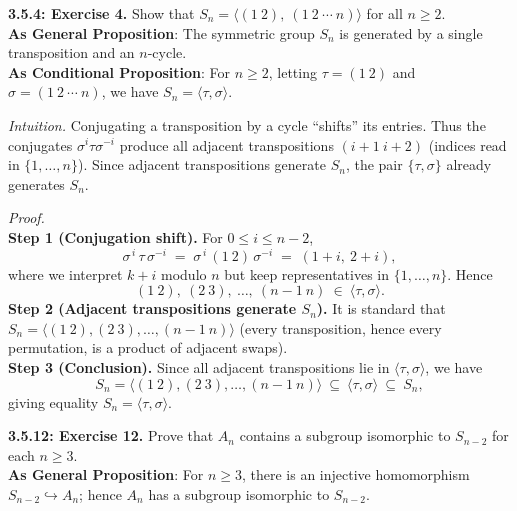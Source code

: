 \documentclass[12pt]{article}
\theoremstyle{definition}
\begin{document}
\newpage

\noindent \textbf{3.5.4: Exercise 4.} Show that $S_n=\langle (1\ 2),\ (1\ 2\ \cdots\ n)\rangle$ for all $n\ge 2$.\\ %

\noindent\textbf{As General Proposition}: The symmetric group $S_n$ is generated by a single transposition and an $n$-cycle.\\

\noindent \textbf{As Conditional Proposition}: For $n\ge 2$, letting $\tau=(1\ 2)$ and $\sigma=(1\ 2\ \cdots\ n)$, we have $S_n=\langle \tau,\sigma\rangle$.\\

\newpage

\dotfill

\emph{Intuition.} Conjugating a transposition by a cycle “shifts” its entries. Thus the conjugates $\sigma^{i}\tau\sigma^{-i}$ produce all adjacent transpositions $(i+1\ i+2)$ (indices read in $\{1,\dots,n\}$). Since adjacent transpositions generate $S_n$, the pair $\{\tau,\sigma\}$ already generates $S_n$.\\

\dotfill

\emph{Proof.}\\
\textbf{Step 1 (Conjugation shift).} For $0\le i\le n-2$,
\[
\sigma^{\,i}\,\tau\,\sigma^{-i}
\;=\;
\sigma^{\,i}\,(1\ 2)\,\sigma^{-i}
\;=\;
(1+i,\ 2+i),
\]
where we interpret $k+i$ modulo $n$ but keep representatives in $\{1,\dots,n\}$. Hence
\[
(1\ 2),\ (2\ 3),\ \dots,\ (n-1\ n)\ \in\ \langle \tau,\sigma\rangle.
\]
\textbf{Step 2 (Adjacent transpositions generate $S_n$).} It is standard that $S_n=\langle (1\ 2),(2\ 3),\dots,(n-1\ n)\rangle$ (every transposition, hence every permutation, is a product of adjacent swaps).\\
\textbf{Step 3 (Conclusion).} Since all adjacent transpositions lie in $\langle \tau,\sigma\rangle$, we have
\[
S_n=\langle (1\ 2),(2\ 3),\dots,(n-1\ n)\rangle\ \subseteq\ \langle \tau,\sigma\rangle\ \subseteq\ S_n,
\]
giving equality $S_n=\langle \tau,\sigma\rangle$.\\

\newpage

\newpage

\noindent \textbf{3.5.12: Exercise 12.} Prove that $A_n$ contains a subgroup isomorphic to $S_{n-2}$ for each $n\ge 3$.\\ %

\noindent\textbf{As General Proposition}: For $n\ge 3$, there is an injective homomorphism $S_{n-2}\hookrightarrow A_n$; hence $A_n$ has a subgroup isomorphic to $S_{n-2}$.\\
\end{document}
